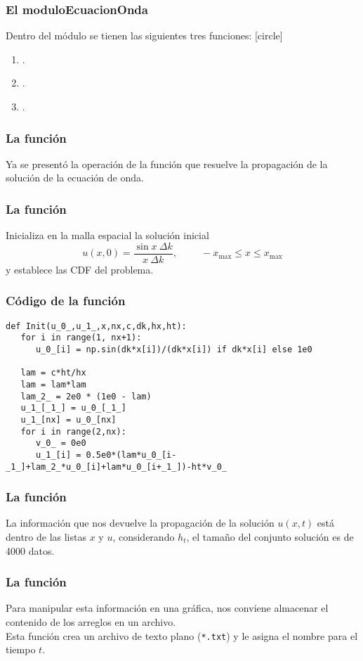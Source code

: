\begin{frame}
\frametitle{El moduloEcuacionOnda}
Dentro del módulo  se tienen las siguientes tres funciones:
[circle]
\begin{enumerate}[<+->]
\item {}.
\item {}.
\item {}.
\end{enumerate}
\end{frame}
\begin{frame}
\frametitle{La función }
Ya se presentó la operación de la función que resuelve la propagación de la solución de la ecuación de onda.
\end{frame}
\begin{frame}
\frametitle{La función }
Inicializa en la malla espacial la solución inicial 
\begin{equation}
u(x, 0) = \dfrac{\sin x \: \Delta k}{x \: \Delta k}, \hspace{1cm} -x_{\text{max}} \leq x \leq x_{\text{max}}
\end{equation}
y establece las CDF del problema.
\end{frame}
\begin{frame}
\frametitle{Código de la función }
\begin{lstlisting}[caption=Nombre Codigo, style=FormattedNumber, basicstyle=\linespread{1.1}\ttfamily=\small, columns=fullflexible]
def Init(u_0_,u_1_,x,nx,c,dk,hx,ht):
   for i in range(1, nx+1):
      u_0_[i] = np.sin(dk*x[i])/(dk*x[i]) if dk*x[i] else 1e0

   lam = c*ht/hx
   lam = lam*lam
   lam_2_ = 2e0 * (1e0 - lam)
   u_1_[_1_] = u_0_[_1_]
   u_1_[nx] = u_0_[nx]
   for i in range(2,nx):
      v_0_ = 0e0
      u_1_[i] = 0.5e0*(lam*u_0_[i-_1_]+lam_2_*u_0_[i]+lam*u_0_[i+_1_])-ht*v_0_
\end{lstlisting}	
\end{frame}
\begin{frame}
\frametitle{La función }
La información que nos devuelve la propagación de la solución $u(x, t)$ está dentro de las listas $x$ y $u$, considerando $h_{t}$, el tamaño del conjunto solución es de 4000 datos.
\end{frame}
\begin{frame}
\frametitle{La función }
Para manipular esta información en una gráfica, nos conviene almacenar el contenido de los arreglos en un archivo.
\\
\bigskip
Esta función crea un archivo de texto plano (\texttt{*.txt}) y le asigna el nombre para el tiempo $t$.
\end{frame}
